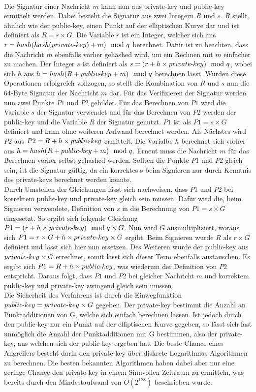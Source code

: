 \documentclass[thesis=bachelor,faculty=cb]{hsmw-thesis}
\begin{document}
\\[1cm]
Die Signatur einer Nachricht $m$ kann nun aus private-key und public-key ermittelt werden. Dabei besteht die Signatur aus zwei Integern $R$ und $s$.
$R$ stellt, ähnlich wie der public-key, einen Punkt auf der elliptischen Kurve dar und ist definiert als $R = r \times G$. Die Variable $r$ ist ein Integer, welcher sich aus $r = hash(hash(private{\text -}key) + m) \mod q$ berechnet. Dafür ist zu beachten, dass die Nachricht $m$ ebenfalls vorher gehashed wird, um ein Rechnen mit $m$ einfacher zu machen.
Der Integer $s$ ist definiert als $s = (r + h \times private{\text -}key) \mod q$, wobei sich $h$ aus $h = hash(R + public{\text -}key + m) \mod q$ berechnen lässt. Wurden diese Operationen erfolgreich vollzogen, so stellt die Kombination von $R$ und $s$ nun die 64-Byte Signatur der Nachricht $m$ dar.
\newpage
Für das Verifizieren der Signatur werden nun zwei Punkte $P1$ und $P2$ gebildet. Für das Berechnen von $P1$ wird die Variable $s$ der Signatur verwendet und für das Berechnen von $P2$
werden der public-key und die Variable $R$ der Signatur genutzt. $P1$ ist als $P1 = s \times G$ definiert und kann ohne weiteren Aufwand berechnet werden. 
Als Nächstes wird $P2$ aus $P2 = R + h \times public{\text -}key$ ermittelt. Die Varialbe $h$ berechnet sich vorher aus $h = hash(R + public{\text -}key + m) \mod q$. 
Erneut muss die Nachricht $m$ für das Berechnen vorher selbst gehashed werden. Sollten die Punkte $P1$ und $P2$ gleich sein, ist die Signatur gültig, da ein korrektes s beim Signieren nur durch Kenntnis des private-keys berechnet werden konnte.
\\[1cm]
Durch Umstellen der Gleichungen lässt sich nachweisen, dass $P1$ und $P2$ bei korrektem public-key und private-key gleich sein müssen. Dafür wird die, beim Signieren verwendete,
Definition von $s$ in die Berechnung von $P1 = s \times G$ eingesetzt. So ergibt sich folgende Gleichung $P1 = (r + h \times private{\text -}key) \mod q \times G$. Nun wird $G$ ausmultipliziert, woraus sich
$P1 = r \times G + h \times private{\text -}key \times G$ ergibt. Beim Signieren wurde $R$ als $r \times G$ definiert und lässt sich hier nun ersetzen. Des Weiteren wurde der public-key aus $private{\text -}key \times G$ errechnet, somit
lässt sich dieser Term ebenfalls austauschen. Es ergibt sich $P1 = R + h \times public{\text -}key$, was wiederum der Definition von $P2$ entspricht. Daraus folgt, dass $P1$ und $P2$ bei gleicher Nachricht $m$
und korrektem public-key und private-key zwingend gleich sein müssen.
\\[1cm]
Die Sicherheit des Verfahrens ist durch die Einwegfunktion $public{\text -}key = private{\text -}key \times G$ gegeben. Der private-key bestimmt die Anzahl an Punktadditionen von G, welche sich einfach berechnen lassen.
Ist jedoch durch den public-key nur ein Punkt auf der elliptischen Kurve gegeben, so lässt sich fast unmöglich die Anzahl der Punktadditionen mit G bestimmen, also der private-key, aus welchen sich 
der public-key ergeben hat. Die beste Chance eines Angreifers besteht darin den private-key über diskrete Logarithmus Algorithmen zu berechnen. Die besten bekannten Algorithmen haben dabei aber
nur eine geringe Chance den private-key in einem Sinnvollen Zeitraum zu ermitteln, was bereits durch den Mindestaufwand von $O(2^{128})$ beschrieben wurde.
\newpage
\end{document}
